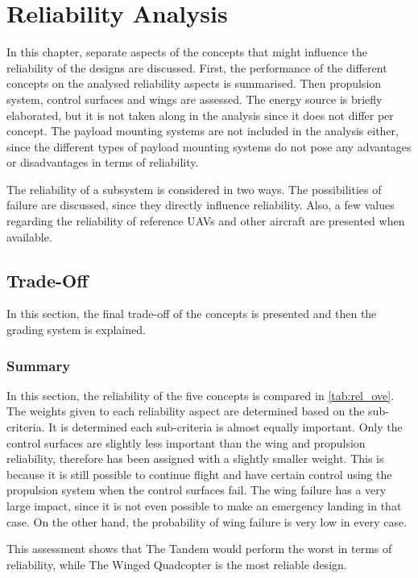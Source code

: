 \chapter{Reliability Analysis}\label{ch:relianal}

In this chapter, separate aspects of the concepts that might influence the reliability of the designs are discussed. First, the performance of the different concepts on the analysed reliability aspects is summarised. Then propulsion system, control surfaces and wings are assessed. The energy source is briefly elaborated, but it is not taken along in the analysis since it does not differ per concept. The payload mounting systems are not included in the analysis either, since the different types of payload mounting systems do not pose any advantages or disadvantages in terms of reliability. 

The reliability of a subsystem is considered in two ways. The possibilities of failure are discussed, since they directly influence reliability. Also, a few values regarding the reliability of reference UAVs and other aircraft are presented when available.

\section{Trade-Off}
In this section, the final trade-off of the concepts is presented and then the grading system is explained. 

\subsection{Summary}
In this section, the reliability of the five concepts is compared in \autoref{tab:rel_ove}. The weights given to each reliability aspect are determined based on the sub-criteria. It is determined each sub-criteria is almost equally important. Only the control surfaces are slightly less important than the wing and propulsion reliability, therefore has been assigned with a slightly smaller weight. This is because it is still possible to continue flight and have certain control using the propulsion system when the control surfaces fail. The wing failure has a very large impact, since it is not even possible to make an emergency landing in that case. On the other hand, the probability of wing failure is very low in every case.

This assessment shows that The Tandem would perform the worst in terms of reliability, while The Winged Quadcopter is the most reliable design. 

